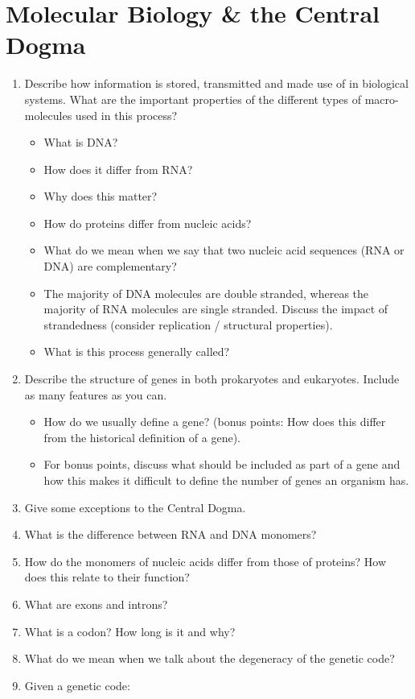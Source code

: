 \documentclass[11pt]{article}
\begin{document}
\section{Molecular Biology \& the Central Dogma}  
\begin{enumerate}
\item Describe how information is stored, transmitted and made use of in biological
  systems. What are the important properties of the different types of
  macro-molecules used in this process?
  \begin{itemize}
    \item What is DNA?
    \item How does it differ from RNA?
    \item Why does this matter?
    \item How do proteins differ from nucleic acids?
    \item What do we mean when we say that two nucleic acid sequences (RNA or
      DNA) are complementary?
    \item The majority of DNA molecules are double stranded, whereas the
      majority of RNA molecules are single stranded. Discuss the impact of
      strandedness (consider replication / structural properties).
    \item What is this process generally called?
  \end{itemize}
\item Describe the structure of genes in both prokaryotes and
  eukaryotes. Include as many features as you can.
  \begin{itemize}
  \item How do we usually define a gene? (bonus points: How does this differ
    from the historical definition of a gene).
  \item For bonus points, discuss what should be included as part of a gene
    and how this makes it difficult to define the number of genes an organism
    has. 
  \end{itemize}
\item Give some exceptions to the Central Dogma.
\item What is the difference between RNA and DNA monomers?
\item How do the monomers of nucleic acids differ from those of proteins? How
  does this relate to their function?
\item What are exons and introns?
\item What is a codon? How long is it and why?
\item What do we mean when we talk about the degeneracy of the genetic code?
\item Given a genetic code:\\
  \begin{minipage}{0.6\textwidth}
  {\tiny
    
  }
  \end{minipage}


\end{enumerate}
\end{document}
